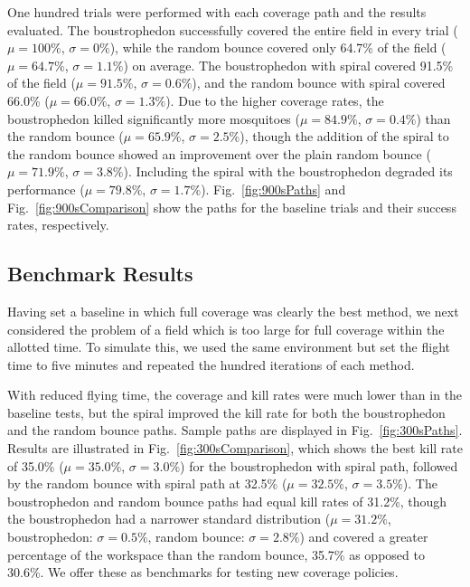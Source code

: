 \documentclass[letterpaper, 10 pt, conference]{ieeeconf}  %
\begin{document}
One hundred trials were performed with each coverage path and the results evaluated.  The boustrophedon successfully covered the entire field in every trial ($\mu=100\%$, $\sigma=0\%$), while the random bounce covered only 64.7\% of the field ($\mu=64.7\%$, $\sigma=1.1\%$) on average.  The boustrophedon with spiral covered 91.5\% of the field ($\mu=91.5\%$, $\sigma=0.6\%$), and the random bounce with spiral covered 66.0\% ($\mu=66.0\%$, $\sigma=1.3\%$).  Due to the higher coverage rates, the boustrophedon killed significantly more mosquitoes ($\mu=84.9\%$, $\sigma=0.4\%$) than the random bounce ($\mu=65.9\%$, $\sigma=2.5\%$), though the addition of the spiral to the random bounce showed an improvement over the plain random bounce ($\mu=71.9\%$, $\sigma=3.8\%$).  Including the spiral with the boustrophedon degraded its performance ($\mu=79.8\%$, $\sigma=1.7\%$).  Fig.~\ref{fig:900sPaths} and Fig.~\ref{fig:900sComparison} show the paths for the baseline trials and their success rates, respectively.

\subsection{Benchmark Results} \label{subsec:SimulationResults2}

Having set a baseline in which full coverage was clearly the best method, we next considered the problem of a field which is too large for full coverage within the allotted time.  To simulate this, we used the same environment but set the flight time to five minutes and repeated the hundred iterations of each method.  

With reduced flying time, the coverage and kill rates were much lower than in the baseline tests, but the spiral improved the kill rate for both the boustrophedon and the random bounce paths.  Sample paths are displayed in Fig.~\ref{fig:300sPaths}.  Results are illustrated in Fig.~\ref{fig:300sComparison}, which shows the best kill rate of 35.0\% ($\mu=35.0\%$, $\sigma=3.0\%$) for the boustrophedon with spiral path, followed by the random bounce with spiral path at 32.5\% ($\mu=32.5\%$, $\sigma=3.5\%$).  The boustrophedon and random bounce paths had equal kill rates of 31.2\%, though the boustrophedon had a narrower standard distribution ($\mu=31.2\%$, boustrophedon:  $\sigma=0.5\%$, random bounce:  $\sigma=2.8\%$) and covered a greater percentage of the workspace than the random bounce, 35.7\% as opposed to 30.6\%.  We offer these as benchmarks for testing new coverage policies.
\end{document}
